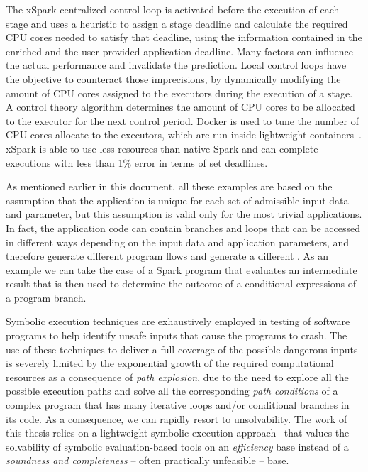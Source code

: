 The xSpark centralized control loop is activated before the execution of each stage and uses a heuristic to assign a stage deadline and calculate the required CPU cores needed to satisfy that deadline, using the information contained in the enriched \plan and the user-provided  application deadline. Many factors can influence the actual performance and invalidate the prediction. Local control loops have the objective to counteract those imprecisions, by dynamically modifying the amount of CPU cores assigned to the executors during the execution of a stage. A control theory algorithm determines the amount of CPU cores to be allocated to the executor for the next control period. Docker is used to tune the number of CPU cores allocate to the executors, which are run inside lightweight containers~\cite{misc:Docker}. xSpark is able to use less resources than native Spark and can complete executions with less than 1\% error in terms of set deadlines.


As mentioned earlier in this document, all these examples are based on the assumption that the application \plan is unique for each set of admissible input data and parameter, but this assumption is valid only for the most trivial applications. In fact, the application code can contain branches and loops that can be accessed in different ways depending on the input data and application parameters, and therefore generate different program flows and generate a different \plan. As an example we can take the case of a Spark program that evaluates an intermediate result that is then used to determine the outcome of a conditional expressions of a program branch.

Symbolic execution techniques are exhaustively employed in testing of software programs to help identify unsafe inputs that cause the programs to crash. The use of these techniques to deliver a  full coverage of the possible dangerous inputs is severely limited by the exponential growth of the required computational resources as a consequence of \textit{path explosion}, due to the need to explore all the possible execution paths and solve all the corresponding \textit{path conditions} of a complex program that has many iterative loops and/or conditional branches in its code. As a consequence, we can rapidly resort to unsolvability. The work of this thesis relies on a lightweight symbolic execution  approach~\cite{Baresi-Quattrocchi-Denaro:2019} that values the solvability of symbolic evaluation-based tools on an \textit{efficiency} base instead of a \textit{soundness and completeness} -- often practically unfeasible -- base.

